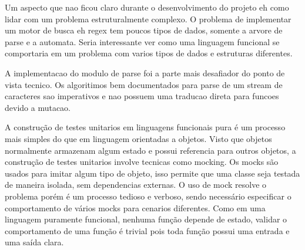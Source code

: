 Um aspecto que nao ficou claro durante o desenvolvimento do projeto eh como lidar com um problema estruturalmente complexo.
O problema de implementar um motor de busca eh regex tem poucos tipos de dados, somente a arvore de parse e a automata.
Seria interessante ver como uma linguagem funcional se comportaria em um problema com varios tipos de dados e estruturas diferentes.

A implementacao do modulo de parse foi a parte mais desafiador do ponto de vista tecnico.
Os algoritimos bem documentados para parse de um stream de caracteres sao imperativos e nao possuem uma traducao direta para funcoes devido a mutacao.

A construção de testes unitarios em linguagens funcionais pura é um processo mais simples do que em linguagem orientadas a objetos.
Visto que objetos normalmente armazenam algum estado e possui referencia para outros objetos, a construção de testes unitarios involve tecnicas como mocking.
Os mocks são usados para imitar algum tipo de objeto, isso permite que uma classe seja testada de maneira isolada, sem dependencias externas.
O uso de mock resolve o problema porém é um processo tedioso e verboso, sendo necessário especificar o comportamento de vários mocks para cenarios diferentes.
Como em uma linguagem puramente funcional, nenhuma função depende de estado, validar o comportamento de uma função é trivial pois toda função possui uma entrada e uma saída clara.

